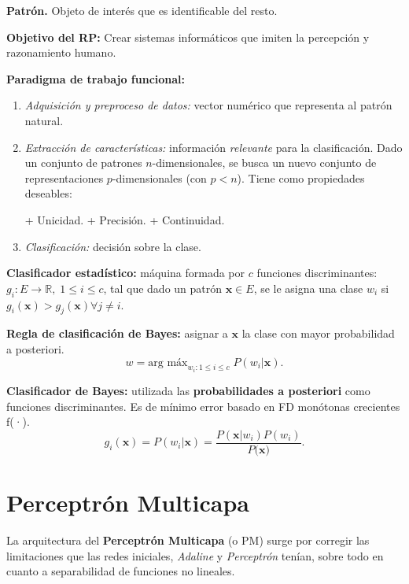 \documentclass[10pt,a4paper]{article}
\begin{document}
\begin{description}
\item \textbf{Patrón.} Objeto de interés que es identificable del resto.
\item \textbf{Objetivo del RP:} Crear sistemas informáticos que imiten la percepción y razonamiento humano.
\item \textbf{Paradigma de trabajo funcional:}
\begin{enumerate}
\item \textit{Adquisición y preproceso de datos:} vector numérico que representa al patrón natural.
\item \textit{Extracción de características:} información \textit{relevante} para la clasificación. Dado un conjunto de patrones $n$-dimensionales, se busca un nuevo conjunto de representaciones $p$-dimensionales (con $p<n$). Tiene como propiedades deseables:
\begin{multicols}{3}
\subitem + Unicidad.
\subitem + Precisión.
\subitem + Continuidad.
\end{multicols}
\item \textit{Clasificación:} decisión sobre la clase.
\end{enumerate}
\item \textbf{Clasificador estadístico:} máquina formada por $c$ funciones discriminantes: $g_i : E \rightarrow \mathbb{R}, \; 1 \leq i \leq c$, tal que dado un patrón $\mathbf{x} \in E$, se le asigna una clase $w_i$ si $g_i(\mathbf{x}) >g_j(\mathbf{x}) \forall j \neq i$.
\item \textbf{Regla de clasificación de Bayes:} asignar a $\mathbf{x}$ la clase con mayor probabilidad a posteriori.
\[ w = \text{arg máx}_{w_i:1\leq i \leq c} \; P(w_i|\mathbf{x}).\]
\item \textbf{Clasificador de Bayes:} utilizada las \textbf{probabilidades a posteriori} como funciones discriminantes. Es de mínimo error basado en FD monótonas crecientes f(·).
\[g_i(\mathbf{x}) = P(w_i|\mathbf{x}) = \frac{P(\mathbf{x}|w_i)P(w_i)}{P(\mathbf{x)}}.\]
\end{description}

\section{Perceptrón Multicapa}

La arquitectura del \textbf{Perceptrón Multicapa} (o PM) surge por corregir las limitaciones que las redes iniciales, \textit{Adaline} y \textit{Perceptrón} tenían, sobre todo en cuanto a separabilidad de funciones no lineales.
\end{document}
